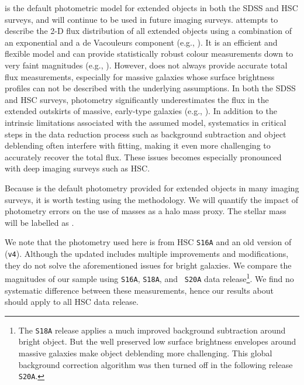 \documentclass[fleqn,usenatbib,useAMS]{mnras}
\begin{document}
    \cmodel{} is the default photometric model for extended objects in both the SDSS and HSC
    surveys, and will continue to be used in future imaging surveys.
    \cmodel{} attempts to describe the 2-D flux distribution of all extended objects using a
    combination of an exponential and a de Vacouleurs component (e.g., \citealt{HSC-PIPE}).
    It is an efficient and flexible model and can provide statistically robust colour measurements
    down to very faint magnitudes (e.g., \citealt{SynPipe}).
    However, \cmodel{} does not always provide accurate total flux measurements, especially for
    massive galaxies whose surface brightness profiles can not be described with the underlying
    assumptions.
    In both the SDSS and HSC surveys, \cmodel{} photometry significantly underestimates the flux in
    the extended outskirts of massive, early-type galaxies (e.g., \citealt{Bernardi2013,
    Huang2018b}).
    In addition to the intrinsic limitations associated with the assumed model, systematics in 
    critical steps in the data reduction process such as background subtraction and object 
    deblending often interfere with \cmodel{} fitting, making it even more challenging to accurately
    recover the total flux.
    These issues becomes especially pronounced with deep imaging surveys such as HSC.

    Because \cmodel{} is the default photometry provided for extended objects in many imaging
    surveys, it is worth testing using the \topn{} methodology. 
    We will quantify the impact of \cmodel{} photometry errors on the use of  \cmodel{} masses 
    as a halo mass proxy. 
    The \cmodel{} stellar mass will be labelled as \mcmodel{}.
    
    We note that the \cmodel{} photometry used here is from HSC \texttt{S16A} and an old
    version of \hscpipe{} (\texttt{v4}).
    Although the updated \hscpipe{} includes multiple improvements and modifications, they do not
    solve the aforementioned issues for bright galaxies.
    We compare the \cmodel{} magnitudes of our sample using \texttt{S16A}, {\tt S18A}, and {\tt
    S20A} data release\footnote{The {\tt S18A} release applies a much improved background
    subtraction around bright object.  But the well preserved low surface brightness envelopes
    around massive galaxies make object deblending more challenging. This global background
    correction algorithm was then turned off in the following release {\tt S20A}.}. 
    We find no systematic difference between these measurements, hence our results about \mcmodel{}
    should apply to all HSC data release.
    
\end{document}
